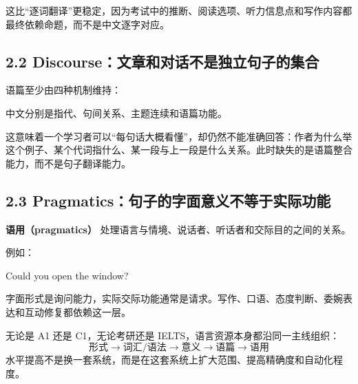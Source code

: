 \documentclass[11pt,a4paper]{ctexart}
\newcommand{\term}[2]{\textbf{#1（#2）}}
\begin{document}
这比“逐词翻译”更稳定，因为考试中的推断、阅读选项、听力信息点和写作内容都最终依赖命题，而不是中文逐字对应。

\subsection{2.2 Discourse：文章和对话不是独立句子的集合}
语篇至少由四种机制维持：
\begin{center}
\end{center}
中文分别是指代、句间关系、主题连续和语篇功能。

这意味着一个学习者可以“每句话大概看懂”，却仍然不能准确回答：作者为什么举这个例子、某个代词指什么、某一段与上一段是什么关系。此时缺失的是语篇整合能力，而不是句子翻译能力。

\subsection{2.3 Pragmatics：句子的字面意义不等于实际功能}
\term{语用}{pragmatics} 处理语言与情境、说话者、听话者和交际目的之间的关系。

例如：
\begin{eng}
Could you open the window?
\end{eng}
字面形式是询问能力，实际交际功能通常是请求。写作、口语、态度判断、委婉表达和互动修复都依赖这一层。

\begin{corebox}[语言资源的稳定主线]
无论是 A1 还是 C1，无论考研还是 IELTS，语言资源本身都沿同一主线组织：
\[
\boxed{
\text{形式}
\rightarrow
\text{词汇/语法}
\rightarrow
\text{意义}
\rightarrow
\text{语篇}
\rightarrow
\text{语用}
}
\]
水平提高不是换一套系统，而是在这套系统上扩大范围、提高精确度和自动化程度。
\end{corebox}
\end{document}
